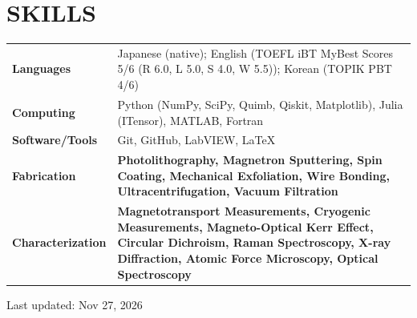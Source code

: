 \documentclass[11pt]{article}
\newcommand{\highlight}[1]{\textcolor{blue!60!cyan}{\textbf{#1}}}
\begin{document}

\section*{SKILLS}
\renewcommand{\arraystretch}{1.3}
\begin{tabular}{@{} l p{} @{}}
\textbf{Languages} &
Japanese (native); English (TOEFL iBT MyBest Scores 5/6 (R 6.0, L 5.0, S 4.0, W 5.5)); Korean (TOPIK PBT 4/6) \\

\textbf{Computing} &
Python (NumPy, SciPy, Quimb, Qiskit, Matplotlib), Julia (ITensor), MATLAB, Fortran \\

\textbf{Software/Tools} &
Git, GitHub, LabVIEW, LaTeX \\

\textbf{Fabrication} &
\highlight{Photolithography, Magnetron Sputtering, Spin Coating,
Mechanical Exfoliation, Wire Bonding,
Ultracentrifugation, Vacuum Filtration} \\

\textbf{Characterization} &
\highlight{Magnetotransport Measurements, Cryogenic Measurements,
Magneto-Optical Kerr Effect,
Circular Dichroism,
Raman Spectroscopy, X-ray Diffraction,
Atomic Force Microscopy, Optical Spectroscopy} \\

\end{tabular}

\vspace{16pt}
\hfill{\footnotesize\color{gray}Last updated: Nov 27, 2026}
\end{document}
